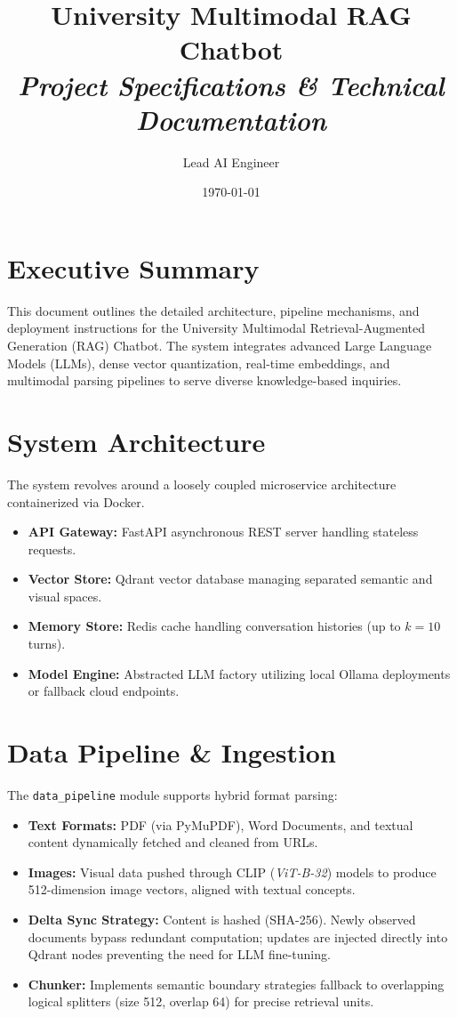 \documentclass[12pt,a4paper]{article}
\title{
    \vspace{2cm}
    \textbf{\huge University Multimodal RAG Chatbot} \\
    \vspace{0.5cm}
    \large \textit{Project Specifications \& Technical Documentation}
}
\author{Lead AI Engineer}
\date{\today}
\begin{document}
\maketitle
\newpage
\tableofcontents
\newpage

\section{Executive Summary}
This document outlines the detailed architecture, pipeline mechanisms, and deployment instructions for the University Multimodal Retrieval-Augmented Generation (RAG) Chatbot. The system integrates advanced Large Language Models (LLMs), dense vector quantization, real-time embeddings, and multimodal parsing pipelines to serve diverse knowledge-based inquiries.

\section{System Architecture}
The system revolves around a loosely coupled microservice architecture containerized via Docker.
\begin{itemize}
    \item \textbf{API Gateway:} FastAPI asynchronous REST server handling stateless requests.
    \item \textbf{Vector Store:} Qdrant vector database managing separated semantic and visual spaces.
    \item \textbf{Memory Store:} Redis cache handling conversation histories (up to $k=10$ turns).
    \item \textbf{Model Engine:} Abstracted LLM factory utilizing local Ollama deployments or fallback cloud endpoints.
\end{itemize}

\section{Data Pipeline \& Ingestion}
The \texttt{data\_pipeline} module supports hybrid format parsing:
\begin{itemize}
    \item \textbf{Text Formats:} PDF (via PyMuPDF), Word Documents, and textual content dynamically fetched and cleaned from URLs.
    \item \textbf{Images:} Visual data pushed through CLIP (\textit{ViT-B-32}) models to produce 512-dimension image vectors, aligned with textual concepts.
    \item \textbf{Delta Sync Strategy:} Content is hashed (SHA-256). Newly observed documents bypass redundant computation; updates are injected directly into Qdrant nodes preventing the need for LLM fine-tuning.
    \item \textbf{Chunker:} Implements semantic boundary strategies fallback to overlapping logical splitters (size 512, overlap 64) for precise retrieval units.
\end{itemize}
\end{document}
